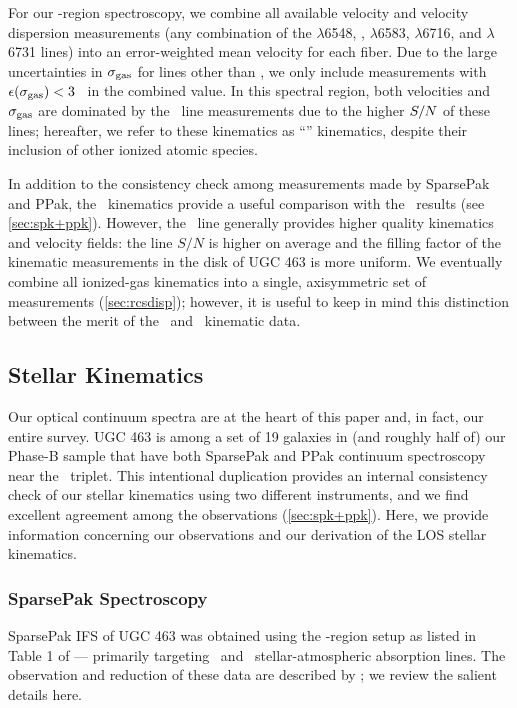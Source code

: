 \documentclass[apj,iop,numberedappendix]{emulateapj}
\begin{document}
For our \halp-region spectroscopy, we combine all available velocity and
velocity dispersion measurements (any combination of the \nii$\lambda$6548,
\halp, \nii$\lambda$6583, \sii$\lambda$6716, and \sii$\lambda$6731 lines) into
an error-weighted mean velocity for each fiber.  Due to the large uncertainties
in $\sigma_{\rm gas}$ for lines other than \halp, we only include measurements with
$\epsilon(\sigma_{\rm gas}) < 3$ \kms\ in the combined value.  In this spectral region, both
velocities and $\sigma_{\rm gas}$ are dominated by the \halp\ line measurements due to the
higher $S/N$ of these lines; hereafter, we refer to these kinematics as
``\halp'' kinematics, despite their inclusion of other ionized atomic species.

In addition to the consistency check among measurements made by SparsePak and
PPak, the \oiii\ kinematics provide a useful comparison with the \halp\ results
(see \sect \ref{sec:spk+ppk}).  However, the \halp\ line generally provides
higher quality kinematics and velocity fields: the line $S/N$ is higher on
average and the filling factor of the kinematic measurements in the disk of UGC
463 is more uniform.  We eventually combine all ionized-gas kinematics into a
single, axisymmetric set of measurements (\sect \ref{sec:rcsdisp}); however, it
is useful to keep in mind this distinction between the merit of the \halp\ and
\oiii\ kinematic data.

\subsection{Stellar Kinematics}

Our optical continuum spectra are at the heart of this paper and, in fact, our
entire survey.  UGC 463 is among a set of 19 galaxies in (and roughly half of)
our Phase-B sample that have both SparsePak and PPak continuum spectroscopy near
the \mgi\ triplet.  This intentional duplication provides an internal
consistency check of our stellar kinematics using two different instruments, and
we find excellent agreement among the observations (\sect \ref{sec:spk+ppk}).
Here, we provide information concerning our observations and our derivation of
the LOS stellar kinematics.

\subsubsection{SparsePak Spectroscopy}
\label{sec:spkstar}

SparsePak IFS of UGC 463 was obtained using the \mgi-region setup as listed
in Table 1 of  --- primarily targeting \fei\ and
\mgi\ stellar-atmospheric absorption lines.  The observation and reduction of
these data are described by \citet{KBWPhD}; we review the salient details here.
\end{document}
